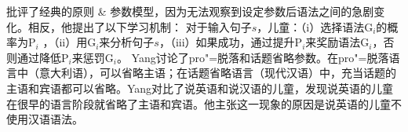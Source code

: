  \citet[]{Yang2004a}批评了经典的原则 \& 参数模型，因为无法观察到设定参数后语法之间的急剧变化。相反，他提出了以下学习机制：
\ea
对于输入句子$s$，儿童：（i）选择语法G$_i$的概率为P$_i$ ，（ii）用G$_i$来分析句子$s$，（iii）如果成功，通过提升P$_i$来奖励语法G$_i$，否则通过降低P$_i$来惩罚G$_i$。
\z
Yang讨论了pro"=脱落和话题省略参数。在pro"=脱落语言中（\eg 意大利语），可以省略主语；在话题省略语言（\egc 现代汉语）中，充当话题的主语和宾语都可以省略。Yang对比了说英语和说汉语的儿童，发现说英语的儿童在很早的语言阶段就省略了主语和宾语。他主张这一现象的原因是说英语的儿童不使用汉语语法。

